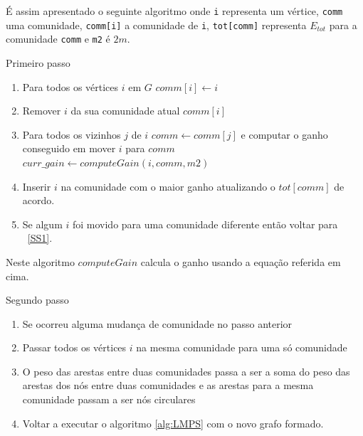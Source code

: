 É assim apresentado o seguinte algoritmo onde \verb|i| representa um vértice, \verb|comm| uma comunidade, \verb|comm[i]| a comunidade de \verb|i|, \verb|tot[comm]| representa $E_{tot}$ para a comunidade \verb|comm| e \verb|m2| é $2m$.
\begin{algorithm}
\caption{Primeiro passo}
\label{alg:LMPS}

	\begin{enumerate}
		\item Para todos os vértices $i$ em $G$ $comm[i] \gets i$
		\label{SS1}
		\item Remover $i$ da sua comunidade atual $comm[i]$
		\item Para todos os vizinhos $j$ de $i$ $comm \gets comm[j]$ e computar o ganho conseguido em mover $i$ para $comm$ $curr\_gain \gets computeGain(i,comm,m2)$
		\item Inserir $i$ na comunidade com o maior ganho atualizando o $tot[comm]$ de acordo.
		\item Se algum $i$ foi movido para uma comunidade diferente então voltar para ~\ref{SS1}.
	\end{enumerate}
\end{algorithm}


Neste algoritmo $computeGain$ calcula o ganho usando a equação referida em cima.

\begin{algorithm}
\caption{Segundo passo}
	\begin{enumerate}
		\item Se ocorreu alguma mudança de comunidade no passo anterior
		\item Passar todos os vértices $i$ na mesma comunidade para uma só comunidade
		\item O peso das arestas entre duas comunidades passa a ser a soma do peso das arestas dos nós entre duas comunidades e as arestas para a mesma comunidade passam a ser nós circulares
		\item Voltar a executar o algoritmo \ref{alg:LMPS} com o novo grafo formado.
	\end{enumerate}
\end{algorithm}

